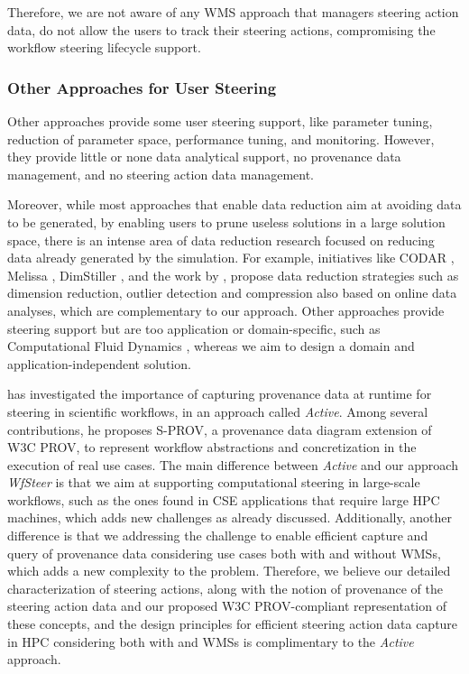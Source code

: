 Therefore, we are not aware of any WMS approach that managers steering action data, do not allow the users to track their steering actions, compromising the workflow steering lifecycle support.


\subsubsection{Other Approaches for User Steering}

Other approaches \cite{Reyes2010Monitoring,Matkovic2014Visual,Cordasco2013Designing}
provide some user steering support, like parameter tuning,
reduction of parameter space, performance tuning, and monitoring.
However, they provide little or none data analytical support, no provenance data
management, and no steering action data management.

Moreover, while most approaches that enable data reduction aim at avoiding data to be generated, \eg{} by
enabling users to prune useless solutions in a large solution space,
there is an intense area of data reduction research focused on reducing
data already generated by the simulation. For example, initiatives like
CODAR \cite{Foster2017Computing},
Melissa \cite{Terraz2017Melissa:},
DimStiller \cite{Ingram2010Dimstiller:},
and the work by \citet{Jin2013Using},
propose data reduction strategies such as dimension reduction, outlier
detection and compression also based on online data analyses, which are
complementary to our approach. Other approaches provide steering support
but are too application or domain-specific, such as Computational Fluid
Dynamics \cite{Garcia2015Computational},
whereas we aim to design a domain and application-independent solution.

\citet{Spinuso2018Active} has investigated the importance of  capturing provenance data at runtime for steering in scientific workflows, in an approach called \textit{Active}. Among several contributions, he proposes S-PROV, a provenance data diagram extension of  W3C PROV, to represent workflow abstractions and concretization in the execution of real use cases.
The main difference between \textit{Active} and our approach \textit{WfSteer} is that we aim at supporting computational steering in large-scale workflows, such as the ones found in CSE applications that require large HPC machines, which adds new challenges as already discussed. 
Additionally, another difference is that we addressing the challenge to enable efficient capture and query of provenance  data considering use cases both with and without WMSs, which adds a new complexity to the problem.
Therefore, we believe our detailed characterization of steering actions, along with the notion of provenance of the steering action data and our proposed W3C PROV-compliant representation of these concepts, and the design principles for efficient steering action data capture in HPC considering both with and WMSs is complimentary to the \textit{Active} approach.


